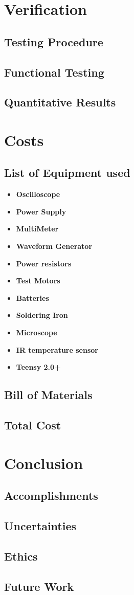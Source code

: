 \documentclass[12pt]{article}
\begin{document}
\section{Verification}
\subsection{Testing Procedure}
\subsection{Functional Testing}
\subsection{Quantitative Results}

\section{Costs}
\subsection{List of Equipment used}
\begin{itemize}
\item{\bf Oscilloscope}
\item{\bf Power Supply}
\item{\bf MultiMeter}
\item{\bf Waveform Generator}
\item{\bf Power resistors}
\item{\bf Test Motors}
\item{\bf Batteries}
\item{\bf Soldering Iron}
\item{\bf Microscope}
\item{\bf IR temperature sensor}
\item{\bf Teensy 2.0+}
\end{itemize}
\subsection{Bill of Materials}
\subsection{Total Cost}

\section{Conclusion}
\subsection{Accomplishments}
\subsection{Uncertainties}
\subsection{Ethics}
\subsection{Future Work}

\newpage
\appendix
\addappheadtotoc

\newpage

\newpage

 
\end{document}

